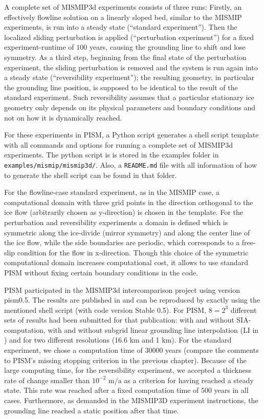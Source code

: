 A complete set of MISMIP3d experiments consists of three runs: Firstly, an effectively flowline solution on a linearly sloped bed, similar to the MISMIP experiments, is run into a steady state (``standard experiment''). Then the localized sliding perturbation is applied (``perturbation experiment'') for a fixed experiment-runtime of $100$ years, causing the grounding line to shift and lose symmetry.  As a third step, beginning from the final state of the perturbation experiment, the sliding perturbation is removed and the system is run again into a steady state (``reversibility experiment''); the resulting geometry, in particular the grounding line position, is supposed to be identical to the result of the standard experiment.  Such reversibility assumes that a particular stationary ice geometry only depends on its physical parameters and boundary conditions and not on how it is dynamically reached.

For these experiments in PISM, a Python script generates a shell script template with all commands and options for running a complete set of MISMIP3d experiments.  The python script is  is stored in the examples folder in \texttt{examples/mismip/mismip3d/}.  Also, a \texttt{README.md} file with all information of how to generate the shell script can be found in that folder.

For the flowline-case standard experiment, as in the MISMIP case, a computational domain with three grid points in the direction orthogonal to the ice flow (arbitrarily chosen as y-direction) is chosen in the template. For the perturbation and reversibility experiments a domain is defined which is symmetric along the ice-divide (mirror symmetry) and along the center line of the ice flow, while the side boundaries are periodic, which corresponds to a free-slip condition for the flow in x-direction. Though this choice of the symmetric computational domain increases computational cost, it allows to use standard PISM without fixing certain boundary conditions in the code.

PISM participated in the MISMIP3d intercomparison project using version pism0.5. The results are published in \cite{MISMIP3d2013} and can be reproduced by exactly using the mentioned shell script (with code version Stable 0.5). For PISM, $8=2^3$ different sets of results had been submitted for that publication: with and without SIA-computation, with and without subgrid linear grounding line interpolation (LI in \cite{Gladstoneetal2012}) and for two different resolutions (16.6 km and 1 km). For the standard experiment, we chose a computation time of $30000$ years (compare the comments to PISM's missing stopping criterion in the previous chapter). Because of the large computing time, for the reversibility experiment, we accepted a thickness rate of change smaller than $10^{−2}$ m/a as a criterion for having reached a steady state. This rate was reached after a fixed computation time of $500$ years in all cases. Furthermore, as demanded in the MISMIP3D experiment instructions, the grounding line reached a static position after that time.

